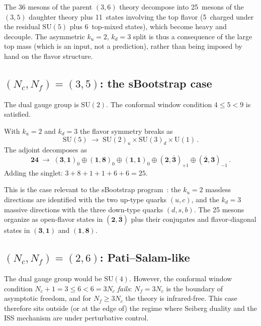 \documentclass[11pt,a4paper]{article}
\newcommand{\Nf}{N_{\!f}}
\newcommand{\Nc}{N_{\!c}}
\newcommand{\rep}[1]{\mathbf{#1}}
\newcommand{\conjrep}[1]{\overline{\mathbf{#1}}}
\begin{document}
The 36 mesons of the parent $(3,6)$ theory decompose into
25~mesons of the $(3,5)$ daughter theory plus 11~states involving
the top flavor (5~charged under the residual $\mathrm{SU}(5)$ plus
6~top-mixed states), which become heavy and decouple.
The asymmetric $k_u = 2$, $k_d = 3$ split is thus a
consequence of the large top mass (which is an input, not a
prediction), rather than being imposed by hand on the flavor
structure.

\subsection{$(\Nc,\Nf) = (3,5)$: the sBootstrap case}
\label{sec:35}

The dual gauge group is $\mathrm{SU}(2)$.
The conformal window condition $4 \le 5 < 9$ is satisfied.

With $k_u = 2$ and $k_d = 3$ the flavor symmetry breaks as
\begin{equation}
  \mathrm{SU}(5) \;\to\;
  \mathrm{SU}(2)_u \times \mathrm{SU}(3)_d \times \mathrm{U}(1)\,.
\end{equation}
The adjoint decomposes as
\begin{equation}
  \rep{24} \;\to\;
  (\rep{3},\rep{1})_0 \oplus (\rep{1},\rep{8})_0
  \oplus (\rep{1},\rep{1})_0
  \oplus (\rep{2},\conjrep{3})_{+1}
  \oplus (\conjrep{2},\rep{3})_{-1}\,.
  \label{eq:adj-35}
\end{equation}
Adding the singlet: $3 + 8 + 1 + 1 + 6 + 6 = 25$.

This is the case relevant to the sBootstrap
program~\cite{Rivero2024}: the $k_u = 2$ massless directions are
identified with the two up-type quarks $(u,c)$, and the $k_d = 3$
massive directions with the three down-type quarks $(d,s,b)$.
The 25 mesons organize as open-flavor states in
$(\rep{2},\conjrep{3})$ plus their conjugates and flavor-diagonal
states in $(\rep{3},\rep{1})$ and $(\rep{1},\rep{8})$.

\subsection{$(\Nc,\Nf) = (2,6)$: Pati--Salam-like}
\label{sec:26}

The dual gauge group would be $\mathrm{SU}(4)$.
However, the conformal window condition
$\Nc + 1 = 3 \le 6 < 6 = 3\Nc$ \emph{fails}: $\Nf = 3\Nc$
is the boundary of asymptotic freedom, and for $\Nf \ge 3\Nc$ the
theory is infrared-free.
This case therefore sits outside (or at the edge of) the regime
where Seiberg duality and the ISS mechanism are under perturbative
control.
\end{document}
